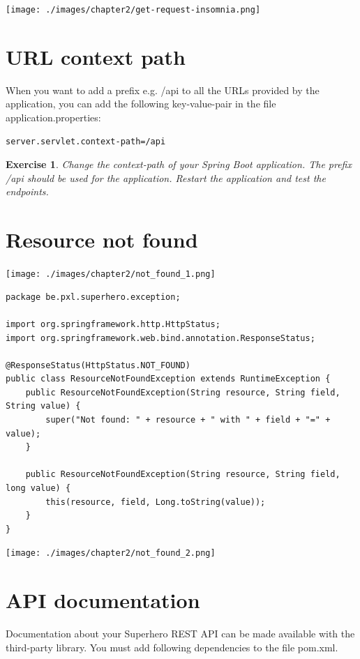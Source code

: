 \documentclass[a4paper, 12pt]{report}
\newenvironment{boxexercise}
{\begin{tcolorbox}
[enhanced jigsaw,breakable,pad at break*=1mm,
 colback=tsyellow!20,boxrule=0pt,frame hidden]}
{\end{tcolorbox}}
\newtheorem{envoefening}{\textbf{Exercise}}[chapter]
\newenvironment{oefening}
               {\begin{boxexercise}\begin{envoefening}}
               {\end{envoefening}\end{boxexercise}}
\begin{document}
\texttt{[image: ./images/chapter2/get-request-insomnia.png]}

\section{URL context path}

When you want to add a prefix e.g. /api to all the URLs provided by the application, you can add the following key-value-pair in the file application.properties:

\begin{lstlisting}[frame=single]
server.servlet.context-path=/api
\end{lstlisting}


\begin{oefening}
Change the context-path of your Spring Boot application. The prefix /api should be used for the application.  Restart the application and test the endpoints.
\end{oefening}

\section{Resource not found}

\texttt{[image: ./images/chapter2/not\_found\_1.png]}

\begin{lstlisting}
package be.pxl.superhero.exception;

import org.springframework.http.HttpStatus;
import org.springframework.web.bind.annotation.ResponseStatus;

@ResponseStatus(HttpStatus.NOT_FOUND)
public class ResourceNotFoundException extends RuntimeException {
    public ResourceNotFoundException(String resource, String field, String value) {
        super("Not found: " + resource + " with " + field + "=" + value);
    }

    public ResourceNotFoundException(String resource, String field, long value) {
        this(resource, field, Long.toString(value));
    }
}
\end{lstlisting}

\texttt{[image: ./images/chapter2/not\_found\_2.png]}

\section{API documentation}

Documentation about your Superhero REST API can be made available with the third-party library. You must add following dependencies to the file pom.xml.
\end{document}
